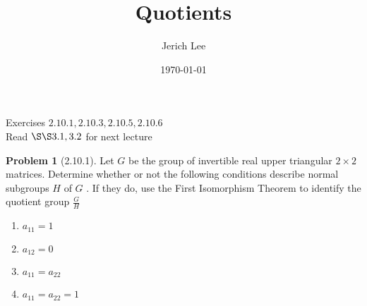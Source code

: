 \documentclass[12pt]{article}
\title{Quotients}
\author{Jerich Lee}
\date{\today}
\theoremstyle{definition} %
\newtheorem{problem}{Problem}
\theoremstyle{plain} %
\begin{document}
\maketitle
Exercises $2.10.1, 2.10.3, 2.10.5, 2.10.6$ \\
Read $\S\S 3.1, 3.2$ for next lecture 
\begin{problem}[2.10.1]
    Let $G$ be the group of invertible real upper triangular $2\times 2$ matrices. Determine whether or not the following conditions describe normal subgroups $H$ of $G$ . If they do, use the First Isomorphism Theorem to identify the quotient group $\frac{G}{H}$
    \noindent
    \begin{enumerate}
        \item $a_{11}=1 $
        \item $a_{12}=0 $
        \item $a_{11} =a_{22} $
        \item $a_{11} =a_{22} =1$    
    \end{enumerate}  
\end{problem}
\end{document}
